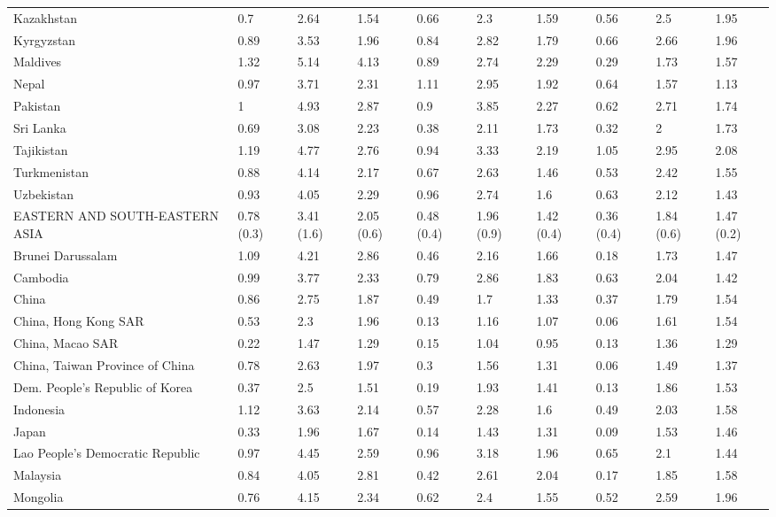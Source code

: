 \begin{longtable}[t]{llllllllll}
Kazakhstan & 0.7 & 2.64 & 1.54 & 0.66 & 2.3 & 1.59 & 0.56 & 2.5 & 1.95\\
Kyrgyzstan & 0.89 & 3.53 & 1.96 & 0.84 & 2.82 & 1.79 & 0.66 & 2.66 & 1.96\\
Maldives & 1.32 & 5.14 & 4.13 & 0.89 & 2.74 & 2.29 & 0.29 & 1.73 & 1.57\\
Nepal & 0.97 & 3.71 & 2.31 & 1.11 & 2.95 & 1.92 & 0.64 & 1.57 & 1.13\\
Pakistan & 1 & 4.93 & 2.87 & 0.9 & 3.85 & 2.27 & 0.62 & 2.71 & 1.74\\
Sri Lanka & 0.69 & 3.08 & 2.23 & 0.38 & 2.11 & 1.73 & 0.32 & 2 & 1.73\\
Tajikistan & 1.19 & 4.77 & 2.76 & 0.94 & 3.33 & 2.19 & 1.05 & 2.95 & 2.08\\
Turkmenistan & 0.88 & 4.14 & 2.17 & 0.67 & 2.63 & 1.46 & 0.53 & 2.42 & 1.55\\
Uzbekistan & 0.93 & 4.05 & 2.29 & 0.96 & 2.74 & 1.6 & 0.63 & 2.12 & 1.43\\
EASTERN AND SOUTH-EASTERN ASIA & 0.78 (0.3) & 3.41 (1.6) & 2.05 (0.6) & 0.48 (0.4) & 1.96 (0.9) & 1.42 (0.4) & 0.36 (0.4) & 1.84 (0.6) & 1.47 (0.2)\\
Brunei Darussalam & 1.09 & 4.21 & 2.86 & 0.46 & 2.16 & 1.66 & 0.18 & 1.73 & 1.47\\
Cambodia & 0.99 & 3.77 & 2.33 & 0.79 & 2.86 & 1.83 & 0.63 & 2.04 & 1.42\\
China & 0.86 & 2.75 & 1.87 & 0.49 & 1.7 & 1.33 & 0.37 & 1.79 & 1.54\\
China, Hong Kong SAR & 0.53 & 2.3 & 1.96 & 0.13 & 1.16 & 1.07 & 0.06 & 1.61 & 1.54\\
China, Macao SAR & 0.22 & 1.47 & 1.29 & 0.15 & 1.04 & 0.95 & 0.13 & 1.36 & 1.29\\
China, Taiwan Province of China & 0.78 & 2.63 & 1.97 & 0.3 & 1.56 & 1.31 & 0.06 & 1.49 & 1.37\\
Dem. People's Republic of Korea & 0.37 & 2.5 & 1.51 & 0.19 & 1.93 & 1.41 & 0.13 & 1.86 & 1.53\\
Indonesia & 1.12 & 3.63 & 2.14 & 0.57 & 2.28 & 1.6 & 0.49 & 2.03 & 1.58\\
Japan & 0.33 & 1.96 & 1.67 & 0.14 & 1.43 & 1.31 & 0.09 & 1.53 & 1.46\\
Lao People's Democratic Republic & 0.97 & 4.45 & 2.59 & 0.96 & 3.18 & 1.96 & 0.65 & 2.1 & 1.44\\
Malaysia & 0.84 & 4.05 & 2.81 & 0.42 & 2.61 & 2.04 & 0.17 & 1.85 & 1.58\\
Mongolia & 0.76 & 4.15 & 2.34 & 0.62 & 2.4 & 1.55 & 0.52 & 2.59 & 1.96\\

\end{longtable}
